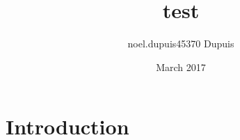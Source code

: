 \documentclass{article}
\title{test}
\author{noel.dupuis45370 Dupuis}
\date{March 2017}
\begin{document}
\maketitle

\section{Introduction}
\end{document}
